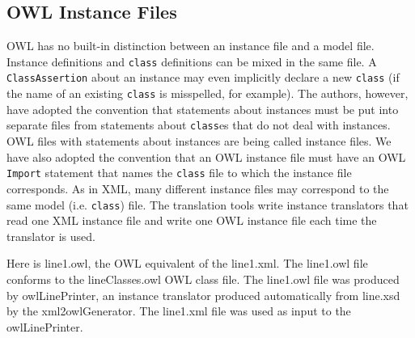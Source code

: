 \documentclass[preprint,12pt]{elsarticle}
\begin{document}
\subsection{OWL Instance Files}
\label{owlInstanceFiles}

OWL has no built-in distinction between an instance file and a model file.
Instance definitions and {\tt class} definitions can be mixed in the same
file. A {\tt ClassAssertion} about an instance may even implicitly declare
a new {\tt class} (if the name of an existing {\tt class} is misspelled,
for example). The authors, however, have adopted the convention that
statements about instances must be put into separate files from statements
about {\tt class}es that do not deal with instances. OWL files with
statements about instances are being called instance files. We have also
adopted the convention that an OWL instance file must have an OWL {\tt
  Import} statement that names the {\tt class} file to which the instance
file corresponds. As in XML, many different instance files may correspond
to the same model (i.e. {\tt class}) file. The translation tools write
instance translators that read one XML instance file and write one OWL
instance file each time the translator is used.

Here is line1.owl, the OWL equivalent of the line1.xml. The line1.owl file
conforms to the lineClasses.owl OWL class file. The line1.owl file
was produced by owlLinePrinter, an instance translator produced
automatically from line.xsd by the xml2owlGenerator. The line1.xml file was
used as input to the owlLinePrinter.
\end{document}
